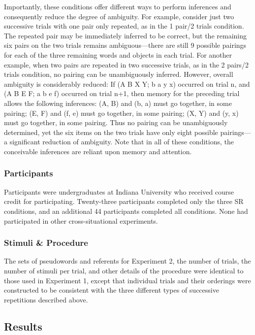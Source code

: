 \documentclass[man,floatsintext]{apa6}
\begin{document}
Importantly, these conditions offer different ways to perform inferences and consequently reduce the degree of ambiguity. For example, consider just two successive trials with one pair only repeated, as in the 1 pair/2 trials condition. The repeated pair may be immediately inferred to be correct, but the remaining six pairs on the two trials remains ambiguous---there are still 9 possible pairings for each of the three remaining words and objects in each trial. For another example, when two pairs are repeated in two successive trials, as in the 2 pairs/2 trials condition, no pairing can be unambiguously inferred. However, overall ambiguity is considerably reduced: If (A B X Y; b a y x) occurred on trial n, and (A B E F; a b e f) occurred on trial n+1, then memory for the preceding trial allows the following inferences: (A, B) and (b, a) must go together, in some pairing; (E, F) and (f, e) must go together, in some pairing; (X, Y) and (y, x) must go together, in some pairing. Thus no pairing can be unambiguously determined, yet the six items on the two trials have only eight possible pairings---a significant reduction of ambiguity. Note that in all of these conditions, the conceivable inferences are reliant upon memory and attention.

\hypertarget{participants-1}{%
\subsubsection{Participants}\label{participants-1}}

Participants were undergraduates at Indiana University who received course credit for participating. Twenty-three participants completed only the three SR conditions, and an additional 44 participants completed all conditions. None had participated in other cross-situational experiments.

\hypertarget{stimuli-procedure}{%
\subsubsection{Stimuli \& Procedure}\label{stimuli-procedure}}

The sets of pseudowords and referents for Experiment 2, the number of trials, the number of stimuli per trial, and other details of the procedure were identical to those used in Experiment 1, except that individual trials and their orderings were constructed to be consistent with the three different types of successive repetitions described above.

\hypertarget{results-1}{%
\subsection{Results}\label{results-1}}
\end{document}
